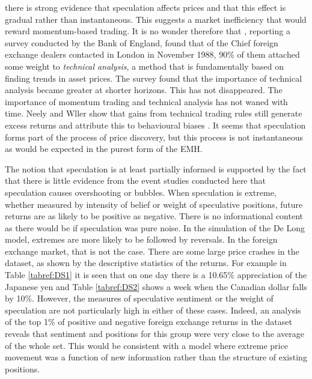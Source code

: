\documentclass[12pt, a4paper, oneside]{article} %
\begin{document}
 there is strong evidence that speculation affects prices and that this effect is gradual rather than instantaneous.  This suggests a market inefficiency that would reward momentum-based trading.  It is no wonder therefore that \citep{TaylorTechnical}, reporting a survey conducted by the Bank of England, found that of the Chief foreign exchange dealers contacted in London in November 1988, 90\% of them attached some weight to \emph{technical analysis}, a method that is fundamentally based on finding trends in asset prices.  The survey found that the importance of technical analysis became greater at shorter horizons.  This has not disappeared.  The importance of momentum trading and technical analysis has not waned with time.  Neely and Wller  show that gains from technical trading rules still generate excess returns and attribute this to behavioural biases \citep{NeelyWeller}. It seems that speculation forms part of the process of price discovery, but this process is not instantaneous as would be expected in the purest form of the EMH.  

The notion that speculation is at least partially informed is supported by the fact that there is little evidence from the event studies conducted here that speculation causes overshooting or bubbles.  When speculation is extreme, whether measured by intensity of belief or weight of speculative positions, future returns are as likely to be positive as negative.  There is no informational content as there would be if speculation was pure noise.  In the simulation of the De Long model, extremes are more likely to be followed by reversals.  In the foreign exchange market, that is not the case.  There are some large price crashes in the dataset, as shown by the descriptive statistics of the returns. For example  in Table \ref{tabref:DS1} it is seen that on one day there is a 10.65\% appreciation of the Japanese yen and Table \ref{tabref:DS2} shows a week when the Canadian dollar falls by 10\%.  However, the measures of speculative sentiment or the weight of speculation are not particularly high in either of these cases.  Indeed, an analysis of the top 1\% of positive and negative foreign exchange returns in the dataset reveals that sentiment and positions for this group were very close to the average of the whole set.  This would be consistent with a model where extreme price movement was a function of new information rather than the structure of existing positions.    
 
\end{document}
